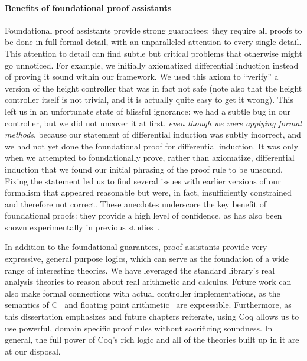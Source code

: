 \paragraph*{Benefits of foundational proof assistants}
\label{sec:proof-assistant}

Foundational proof assistants provide strong guarantees: they require all
proofs to be done in full formal detail, with an unparalleled attention to
every single detail.  This attention to detail can find subtle but critical
problems that otherwise might go unnoticed.  For example, we initially
axiomatized differential induction instead of proving it sound within our
framework.  We used this axiom to ``verify'' a version of the height
controller that was in fact not safe (note also that the height controller
itself is not trivial, and it is actually quite easy to get it wrong).
This left us in an unfortunate state of blissful ignorance: we had a subtle
bug in our controller, but we did not uncover it at first, \emph{even
  though we were applying formal methods}, because our statement of
differential induction was subtly incorrect, and we had not yet done the
foundational proof for differential induction.  It was only when we
attempted to foundationally prove, rather than axiomatize, differential
induction that we found our initial phrasing of the proof rule to be
unsound.  Fixing the statement led us to find several issues with earlier
versions of our formalism that appeared reasonable but were, in fact,
insufficiently constrained and therefore not correct.  These anecdotes
underscore the key benefit of foundational proofs: they provide a high
level of confidence, as has also been shown experimentally in previous
studies~\cite{yang2011understanding-compiler-bugs}.

In addition to the foundational guarantees, proof assistants provide very
expressive, general purpose logics, which can serve as the foundation of a
wide range of interesting theories.  We have leveraged the standard
library's real analysis theories to reason about real arithmetic and
calculus.  Future work can also make formal connections with actual
controller implementations, as the semantics of C~\cite{leroy2009compcert}
and floating point arithmetic~\cite{floqc11} are expressible. Furthermore,
as this dissertation emphasizes and future chapters reiterate, using Coq
allows us to use powerful, domain specific proof rules without sacrificing
soundness. In general, the full power of Coq's rich logic and all of the
theories built up in it are at our disposal.

